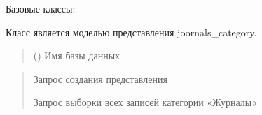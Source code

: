 \documentclass[letterpaper,10pt,russian]{sphinxmanual}
\begin{document}
\begin{fulllineitems}
\label{\detokenize{database.sqlite3_interface.views:database.sqlite3_interface.views.view_joornals.ViewJoornals}}
\pysigstartsignatures
{}
\pysigstopsignatures
\sphinxAtStartPar
Базовые классы: {\hyperref[\detokenize{database.sqlite3_interface.views:database.sqlite3_interface.views.view.View}]{}}

\sphinxAtStartPar
Класс является моделью представления joornals\_category.
\begin{quote}\begin{description}
\sphinxAtStartPar
{} () \textendash{} Имя базы данных

\end{description}\end{quote}
\begin{description}
\begin{quote}\begin{description}
\sphinxAtStartPar
Запрос создания представления

\sphinxAtStartPar
Запрос выборки всех записей категории «Журналы»

\end{description}\end{quote}


\end{description}
\end{fulllineitems}
\end{document}

